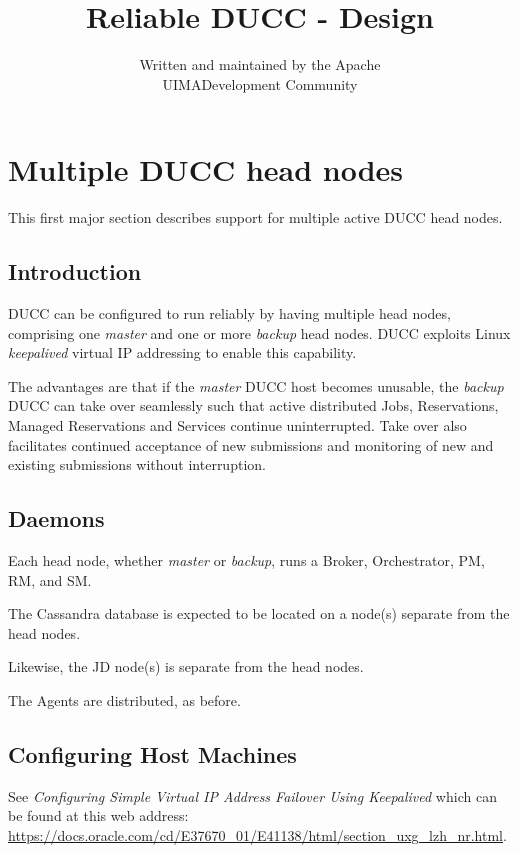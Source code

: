 \documentclass[letterpaper]{article}
\title{Reliable DUCC - Design}
\author{Written and maintained by the Apache \\
UIMA\texttrademark Development Community}
\date{}
\begin{document}
\maketitle

\newpage



\section{Multiple DUCC head nodes}

This first major section describes support for multiple active DUCC head nodes.

\subsection{Introduction}
    DUCC can be configured to run reliably by having multiple head nodes,
    comprising one {\em master} and one or more {\em backup} head nodes.
    DUCC exploits Linux {\em keepalived} virtual IP addressing to enable
    this capability.
    
    The advantages are that if the {\em master} DUCC host becomes
    unusable, the {\em backup} DUCC can take over seamlessly
    such that active distributed Jobs, Reservations, Managed Reservations 
    and Services continue uninterrupted.  Take over also facilitates
    continued acceptance of new submissions and monitoring of new and
    existing submissions without interruption.

\subsection{Daemons}
   Each head node, whether {\em master} or {\em backup}, runs a Broker,
   Orchestrator, PM, RM, and SM.
   
   The Cassandra database is expected to be located on a node(s) separate from the head nodes.
   
   Likewise, the JD node(s) is separate from the head nodes.
   
   The Agents are distributed, as before.
        
\subsection{Configuring Host Machines}    
    See {\em Configuring Simple Virtual IP Address Failover Using Keepalived} 
    which can be found at this web address: 
    \url{https://docs.oracle.com/cd/E37670_01/E41138/html/section_uxg_lzh_nr.html}.
\end{document}
